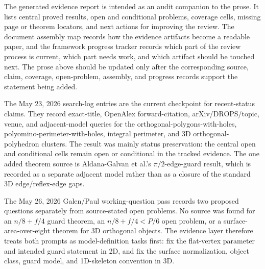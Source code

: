 \documentclass[11pt]{article}
\begin{document}
The generated evidence report is intended as an audit companion to the prose.
It lists central proved results, open and conditional problems, coverage cells,
missing page or theorem locators, and next actions for improving the review.
The document assembly map records how the evidence artifacts become a readable
paper, and the framework progress tracker records which part of the review
process is current, which part needs work, and which artifact should be touched
next.  The prose above should be updated only after the corresponding source,
claim, coverage, open-problem, assembly, and progress records support the
statement being added.

The May 23, 2026 search-log entries are the current checkpoint for
recent-status claims.  They record exact-title, OpenAlex forward-citation,
arXiv/DROPS/topic, venue, and adjacent-model queries for the
orthogonal-polygons-with-holes, polyomino-perimeter-with-holes, integral
perimeter, and 3D orthogonal-polyhedron clusters.  The result was mainly
status preservation: the central open and conditional cells remain open or
conditional in the tracked evidence.  The one added theorem source is
Aldana-Galvan et al.'s $\pi/2$-edge-guard result, which is recorded as a
separate adjacent model rather than as a closure of the standard 3D
edge/reflex-edge gaps.

The May 26, 2026 Galen/Paul working-question pass records two proposed
questions separately from source-stated open problems.  No source was found for
an $n/8+f/4$ guard theorem, an $n/8+f/4<P/6$ open problem, or a
surface-area-over-eight theorem for 3D orthogonal objects.  The evidence layer
therefore treats both prompts as model-definition tasks first: fix the
flat-vertex parameter and intended guard statement in 2D, and fix the surface
normalization, object class, guard model, and 1D-skeleton convention in 3D.
\end{document}
